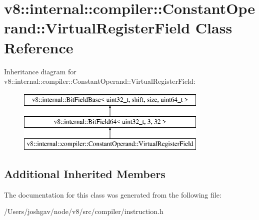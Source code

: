 \hypertarget{classv8_1_1internal_1_1compiler_1_1_constant_operand_1_1_virtual_register_field}{}\section{v8\+:\+:internal\+:\+:compiler\+:\+:Constant\+Operand\+:\+:Virtual\+Register\+Field Class Reference}
\label{classv8_1_1internal_1_1compiler_1_1_constant_operand_1_1_virtual_register_field}
Inheritance diagram for v8\+:\+:internal\+:\+:compiler\+:\+:Constant\+Operand\+:\+:Virtual\+Register\+Field\+:\begin{figure}[H]
\begin{center}
\leavevmode
\includegraphics[height=3.000000cm]{classv8_1_1internal_1_1compiler_1_1_constant_operand_1_1_virtual_register_field}
\end{center}
\end{figure}
\subsection*{Additional Inherited Members}


The documentation for this class was generated from the following file\+:\begin{DoxyCompactItemize}
\item 
/\+Users/joshgav/node/v8/src/compiler/instruction.\+h\end{DoxyCompactItemize}
